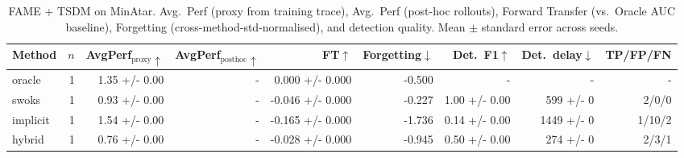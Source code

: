 \begin{table}[t]
\centering
\caption{FAME + TSDM on MinAtar. Avg.~Perf (proxy from training trace), Avg.~Perf (post-hoc rollouts), Forward Transfer (vs.~Oracle AUC baseline), Forgetting (cross-method-std-normalised), and detection quality. Mean $\pm$ standard error across seeds.}
\label{tab:fame-tsdm}
\begin{tabular}{lrrrrrrrr}
\toprule
Method & $n$ & AvgPerf$_{\text{proxy}}\uparrow$ & AvgPerf$_{\text{posthoc}}\uparrow$ & FT$\uparrow$ & Forgetting$\downarrow$ & Det.\ F1$\uparrow$ & Det.\ delay$\downarrow$ & TP/FP/FN \\
\midrule
oracle & 1 & 1.35 +/- 0.00 & - & 0.000 +/- 0.000 & -0.500 & - & - & - \\
swoks & 1 & 0.93 +/- 0.00 & - & -0.046 +/- 0.000 & -0.227 & 1.00 +/- 0.00 & 599 +/- 0 & 2/0/0 \\
implicit & 1 & 1.54 +/- 0.00 & - & -0.165 +/- 0.000 & -1.736 & 0.14 +/- 0.00 & 1449 +/- 0 & 1/10/2 \\
hybrid & 1 & 0.76 +/- 0.00 & - & -0.028 +/- 0.000 & -0.945 & 0.50 +/- 0.00 & 274 +/- 0 & 2/3/1 \\
\bottomrule
\end{tabular}
\end{table}
